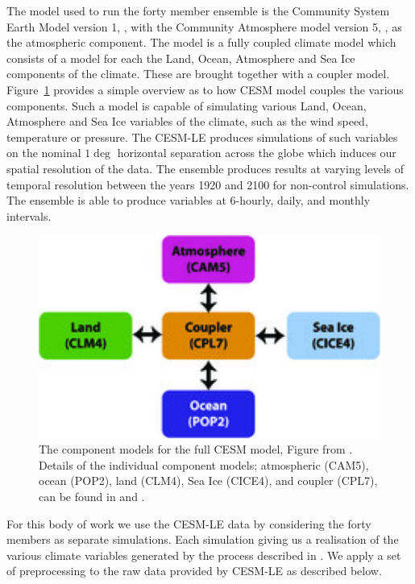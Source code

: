  The model used to run the forty member ensemble is the Community System Earth Model version 1, \citep{hurrell_community_2013}, with the Community Atmosphere model version 5, \citep{hurrell_community_2013}, as the atmospheric component.
 The model is a fully coupled climate model which consists of a model for each the Land, Ocean, Atmosphere and Sea Ice components of the climate.
 These are brought together with a coupler model.
 Figure~\ref{fig:cesm} provides a simple overview as to how CESM model couples the various components.
 Such a model is capable of simulating various Land, Ocean, Atmosphere and Sea Ice variables of the climate, such as the wind speed, temperature or pressure.
 The CESM-LE produces simulations of such variables on the nominal $1\deg$ horizontal separation across the globe which induces our spatial resolution of the data.
 The ensemble produces results at varying levels of temporal resolution between the years 1920 and 2100 for non-control simulations. The ensemble is able to produce variables at 6-hourly, daily, and monthly intervals. 
 
 \begin{figure}[htbp!] 
 	\centering    
 	\includegraphics[width=1.0\textwidth]{cesm_components}
 	\caption[CESM component models]{The component models for the full CESM model, Figure from \citep{kay_community_2015}. Details of the individual component models; atmospheric (CAM5), ocean (POP2), land (CLM4), Sea Ice (CICE4), and coupler (CPL7), can be found in \citep{kay_community_2015} and \citep{hurrell_community_2013}.}
 	\label{fig:cesm}
 \end{figure}

 For this body of work we use the CESM-LE data by considering the forty members as separate simulations.
 Each simulation giving us a realisation of the various climate variables generated by the process described in \citep{kay_community_2015}.
 We apply a set of preprocessing to the raw data provided by CESM-LE as described below. 
 
